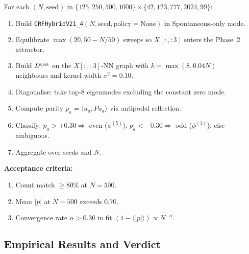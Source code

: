 \documentclass[12pt, a4paper]{article}
\begin{document}
\begin{formalbox}[title={ENG-AA01 Protocol (TASK-ZC06)}]
For each $(N, \mathrm{seed})$ in
$\{125, 250, 500, 1000\} \times \{42, 123, 777, 2024, 99\}$:
\begin{enumerate}[leftmargin=*]
\item Build \texttt{CRFHybridV21\_4}$(N, \mathrm{seed},
  \mathrm{policy=None})$ in Spontaneous-only mode.
\item Equilibrate $\max(20, 50 - N/50)$ sweeps so $X[:,:3]$ enters
  the Phase~2 attractor.
\item Build $L^{\rm spat}$ on the $X[:,:3]$-NN graph with
  $k = \max(8, 0.04 N)$ neighbours and kernel width
  $\sigma^2 = 0.10$.
\item Diagonalise: take top-8 eigenmodes excluding the constant
  zero mode.
\item Compute parity $p_a = \langle u_a, P u_a \rangle$ via
  antipodal reflection.
\item Classify: $p_a > +0.30 \Rightarrow$ even ($\phi^{(5)}$);
  $p_a < -0.30 \Rightarrow$ odd ($\phi^{(3)}$); else ambiguous.
\item Aggregate over seeds and $N$.
\end{enumerate}

\textbf{Acceptance criteria:}
\begin{enumerate}[label=(\alph*), leftmargin=*]
\item Count match $\ge 80\%$ at $N = 500$.
\item Mean $|p|$ at $N = 500$ exceeds $0.70$.
\item Convergence rate $\alpha > 0.30$ in fit
  $(1 - \langle |p| \rangle) \propto N^{-\alpha}$.
\end{enumerate}
\end{formalbox}

\subsection{Empirical Results and Verdict}
\end{document}
